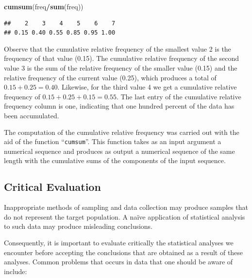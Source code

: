 \documentclass[
]{krantz}
\makeatletter
\newenvironment{Shaded}{\begin{snugshade}}{\end{snugshade}}
\newcommand{\KeywordTok}[1]{\textcolor[rgb]{0.13,0.29,0.53}{\textbf{#1}}}
\newcommand{\NormalTok}[1]{#1}
\newcommand{\OperatorTok}[1]{\textcolor[rgb]{0.81,0.36,0.00}{\textbf{#1}}}
\newenvironment{kframe}{%
\medskip{}
\setlength{\fboxsep}{.8em}
 \def\at@end@of@kframe{}%
 \ifinner\ifhmode%
  \def\at@end@of@kframe{\end{minipage}}%
  \begin{minipage}{\columnwidth}%
 \fi\fi%
 \def\FrameCommand##1{\hskip\@totalleftmargin \hskip-\fboxsep
 \colorbox{shadecolor}{##1}\hskip-\fboxsep
     \hskip-\linewidth \hskip-\@totalleftmargin \hskip\columnwidth}%
 \MakeFramed {\advance\hsize-\width
   \@totalleftmargin\z@ \linewidth\hsize
   \@setminipage}}%
 {\par\unskip\endMakeFramed%
 \at@end@of@kframe}
\renewenvironment{Shaded}{\begin{kframe}}{\end{kframe}}
\theoremstyle{definition}
\theoremstyle{definition}
\theoremstyle{definition}
\theoremstyle{remark}
\makeatother
\begin{document}
\begin{Shaded}
\begin{Highlighting}[]
\KeywordTok{cumsum}\NormalTok{(freq}\OperatorTok{/}\KeywordTok{sum}\NormalTok{(freq))}
\end{Highlighting}
\end{Shaded}

\begin{verbatim}
##    2    3    4    5    6    7 
## 0.15 0.40 0.55 0.85 0.95 1.00
\end{verbatim}

Observe that the cumulative relative frequency of the smallest value 2 is the frequency of that value (0.15). The cumulative relative frequency of the second value 3 is the sum of the relative frequency of the smaller value (0.15) and the relative frequency of the current value (0.25), which produces a total of \(0.15 + 0.25 = 0.40\). Likewise, for the third value 4 we get a cumulative relative frequency of \(0.15 + 0.25 + 0.15 = 0.55\). The last entry of the cumulative relative frequency column is one, indicating that one hundred percent of the data has been accumulated.

The computation of the cumulative relative frequency was carried out with the aid of the function ``\texttt{cumsum}''. This function takes as an input argument a numerical sequence and produces as output a numerical sequence of the same length with the cumulative sums of the components of the input sequence.

\hypertarget{critical-evaluation}{%
\subsection{Critical Evaluation}\label{critical-evaluation}}

Inappropriate methods of sampling and data collection may produce samples that do not represent the target population. A naïve application of statistical analysis to such data may produce misleading conclusions.

Consequently, it is important to evaluate critically the statistical analyses we encounter before accepting the conclusions that are obtained as a result of these analyses. Common problems that occurs in data that one should be aware of include:
\end{document}
